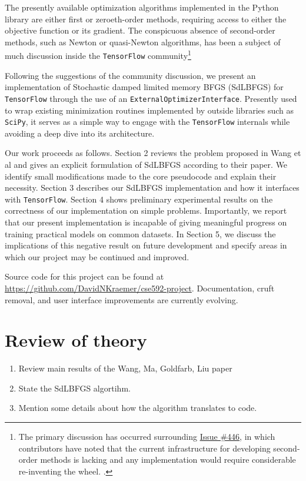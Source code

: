 \documentclass{article}
\begin{document}
The presently available optimization algorithms implemented in the Python
library are either first or zeroeth-order methods, requiring access to either
the objective function or its gradient. The conspicuous absence of second-order
methods, such as Newton or quasi-Newton algorithms, has been a subject of much
discussion inside the \texttt{TensorFlow} community\footnote{%
  The primary discussion has occurred surrounding
  \href{https://github.com/tensorflow/tensorflow/issues/446}{Issue \#446}, in
  which contributors have noted that the current infrastructure for developing
  second-order methods is lacking and any implementation would require
  considerable re-inventing the wheel.
.}

Following the suggestions of the community discussion, we present an
implementation of Stochastic damped limited memory BFGS (SdLBFGS) for
\texttt{TensorFlow} through the use of an \texttt{ExternalOptimizerInterface}.
Presently used to wrap existing minimization routines implemented by outside
libraries such as \texttt{SciPy}, it serves as a simple way to engage with the
\texttt{TensorFlow} internals while avoiding a deep dive into its architecture.

Our work proceeds as follows. Section 2 reviews the problem proposed in Wang et
al and gives an explicit formulation of SdLBFGS according to their paper. We
identify small modifications made to the core pseudocode and explain their
necessity. Section 3 describes our SdLBFGS implementation and how it interfaces
with \texttt{TensorFlow}. Section 4 shows preliminary experimental results on
the correctness of our implementation on simple problems. Importantly, we report
that our present implementation is incapable of giving meaningful progress on
training practical models on common datasets. In Section 5, we discuss the
implications of this negative result on future development and specify areas in
which our project may be continued and improved.

Source code for this project can be found at
\url{https://github.com/DavidNKraemer/cse592-project}. Documentation, cruft
removal, and user interface improvements are currently evolving.

\section{Review of theory}


\begin{enumerate}
  \item Review main results of the Wang, Ma, Goldfarb, Liu paper
    \cite{sdlbfgs}
  \item State the SdLBFGS algortihm.
  \item Mention some details about how the algorithm translates to code.
\end{enumerate}
\end{document}
